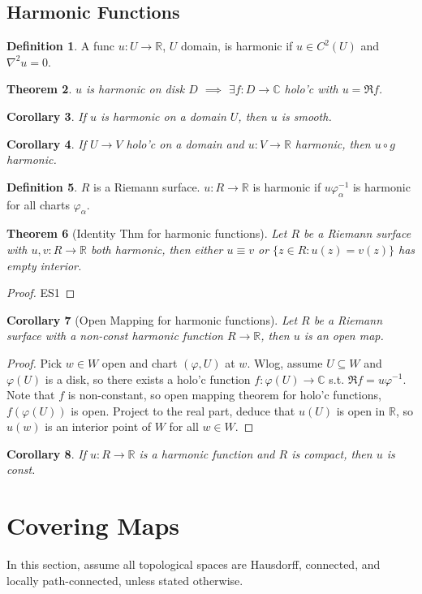 \documentclass{article}
\theoremstyle{definition}
\newtheorem{defn}{Definition}[section]
\theoremstyle{remark}
\theoremstyle{plain}
\newtheorem{thm}[defn]{Theorem}
\newtheorem{crly}[defn]{Corollary}
\newcommand{\RR}{\mathbb{R}}
\newcommand{\CC}{\mathbb{C}}
\begin{document}
\subsection{Harmonic Functions}
\begin{defn}
    A func $u:U\to\RR$, $U$ domain, is harmonic if $u\in C^2(U)$ and $\nabla^2u=0$.
\end{defn}
\begin{thm}
    $u$ is harmonic on disk $D$ $\implies$ $\exists f:D\to\CC$ holo'c with $u=\Re f$.
\end{thm}
\begin{crly}
    If $u$ is harmonic on a domain $U$, then $u$ is smooth.
\end{crly}
\begin{crly}
    If $U\to V$ holo'c on a domain and $u:V\to\RR$ harmonic, then $u\circ g$ harmonic.
\end{crly}
\begin{defn}
    $R$ is a Riemann surface. $u:R\to\RR$ is harmonic if $u\varphi_\alpha^{-1}$ is harmonic for all charts $\varphi_\alpha$.
\end{defn}
\begin{thm}[Identity Thm for harmonic functions]
    Let $R$ be a Riemann surface with $u,v:R\to\RR$ both harmonic, then either $u\equiv v$ or $\{z\in R:u(z)=v(z)\}$ has empty interior.
\end{thm}
\begin{proof}
    ES1
\end{proof}
\begin{crly}[Open Mapping for harmonic functions]
    Let $R$ be a Riemann surface with a non-const harmonic function $R\to \RR$, then $u$ is an open map.
\end{crly}
\begin{proof}
    Pick $w\in W$ open and chart $(\varphi, U)$ at $w$. Wlog, assume $U\subseteq W$ and $\varphi(U)$ is a disk, so there exists a holo'c function $f:\varphi(U)\to\CC$ s.t. $\Re f=u\varphi^{-1}$. Note that $f$ is non-constant, so open mapping theorem for holo'c functions, $f(\varphi(U))$ is open. Project to the real part, deduce that $u(U)$ is open in $\RR$, so $u(w)$ is an interior point of $W$ for all $w\in W$.
\end{proof}
\begin{crly}
    If $u:R\to\RR$ is a harmonic function and $R$ is compact, then $u$ is const.
\end{crly}
\section{Covering Maps}
In this section, assume all topological spaces are Hausdorff, connected, and locally path-connected, unless stated otherwise.
\end{document}
